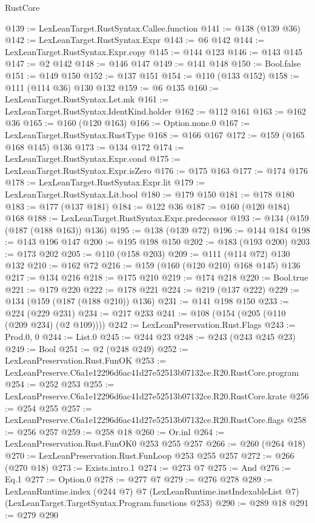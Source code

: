 \begin{lexlean}{RustCore}
\begin{coremodule}
@139 := LexLeanTarget.RustSyntax.Callee.function
@141 := @138 (@139 @36)
@142 := LexLeanTarget.RustSyntax.Expr
@143 := @6 @142
@144 := LexLeanTarget.RustSyntax.Expr.copy
@145 := @144 @123
@146 := @143 @145
@147 := @2 @142
@148 := @146 @147
@149 := @141 @148
@150 := Bool.false
@151 := @149 @150
@152 := @137 @151
@154 := @110 (@133 @152)
@158 := @111 (@114 @36) @130 @132
@159 := @6 @135
@160 := LexLeanTarget.RustSyntax.Let.mk
@161 := LexLeanTarget.RustSyntax.IdentKind.holder
@162 := @112 @161
@163 := @162 @36
@165 := @160 (@120 @163)
@166 := Option.none.{0}
@167 := LexLeanTarget.RustSyntax.RustType
@168 := @166 @167
@172 := @159 (@165 @168 @145) @136
@173 := @134 @172
@174 := LexLeanTarget.RustSyntax.Expr.cond
@175 := LexLeanTarget.RustSyntax.Expr.isZero
@176 := @175 @163
@177 := @174 @176
@178 := LexLeanTarget.RustSyntax.Expr.lit
@179 := LexLeanTarget.RustSyntax.Lit.bool
@180 := @179 @150
@181 := @178 @180
@183 := @177 (@137 @181)
@184 := @122 @36
@187 := @160 (@120 @184) @168
@188 := LexLeanTarget.RustSyntax.Expr.predecessor
@193 := @134 (@159 (@187 (@188 @163)) @136)
@195 := @138 (@139 @72)
@196 := @144 @184
@198 := @143 @196 @147
@200 := @195 @198 @150
@202 := @183 (@193 @200)
@203 := @173 @202
@205 := @110 (@158 @203)
@209 := @111 (@114 @72) @130 @132
@210 := @162 @72
@216 := @159 (@160 (@120 @210) @168 @145) @136
@217 := @134 @216
@218 := @175 @210
@219 := @174 @218
@220 := Bool.true
@221 := @179 @220
@222 := @178 @221
@224 := @219 (@137 @222)
@229 := @134 (@159 (@187 (@188 @210)) @136)
@231 := @141 @198 @150
@233 := @224 (@229 @231)
@234 := @217 @233
@241 := @108 (@154 (@205 (@110 (@209 @234) (@2 @109))))
@242 := LexLeanPreservation.Rust.Flags
@243 := Prod.{0, 0}
@244 := List.{0}
@245 := @244 @23
@248 := @243 (@243 @245 @23)
@249 := Bool
@251 := @2 (@248 @249)
@252 := LexLeanPreservation.Rust.FunOK
@253 := LexLeanPreserve.C6a1e12296d6ac41d27e52513b07132ce.R20.RustCore.program
@254 := @252 @253
@255 := LexLeanPreserve.C6a1e12296d6ac41d27e52513b07132ce.R20.RustCore.krate
@256 := @254 @255
@257 := LexLeanPreserve.C6a1e12296d6ac41d27e52513b07132ce.R20.RustCore.flags
@258 := @256 @257
@259 := @258 @18
@260 := Or.inl
@264 := LexLeanPreservation.Rust.FunOK0 @253 @255 @257
@266 := @260 (@264 @18)
@270 := LexLeanPreservation.Rust.FunLoop @253 @255 @257
@272 := @266 (@270 @18)
@273 := Exists.intro.{1}
@274 := @273 @7
@275 := And
@276 := Eq.{1}
@277 := Option.{0}
@278 := @277 @7
@279 := @276 @278
@289 := LexLeanRuntime.index
    (@244 @7)
    @7
    (LexLeanRuntime.instIndexableList @7)
    (LexLeanTarget.TargetSyntax.Program.functions @253)
@290 := @289 @18
@291 := @279 @290

\end{coremodule}
\end{lexlean}

